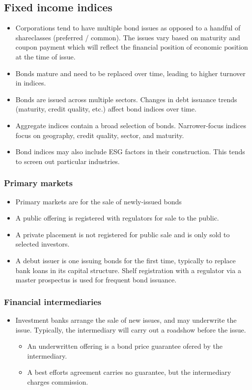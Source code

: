 \documentclass[../notes_compiled.tex]{subfiles}
\begin{document}
\subsection{Fixed income indices}
\begin{itemize}
\item Corporations tend to have multiple bond issues as opposed to a handful of shareclasses (preferred / common). The issues vary based on maturity and coupon payment which will reflect the financial position of economic position at the time of issue.
\item Bonds mature and need to be replaced over time, leading to higher turnover in indices.
\item Bonds are issued across multiple sectors. Changes in debt issuance trends (maturity, credit quality, etc.) affect bond indices over time.
\item Aggregate indices contain a broad selection of bonds. Narrower-focus indices focus on geography, credit quality, sector, and maturity.
\item Bond indices may also include ESG factors in their construction. This tends to screen out particular industries.
\end{itemize}

\subsubsection*{Primary markets}
\begin{itemize}
\item[] Primary markets are for the sale of newly-issued bonds
\item A public offering is registered with regulators for sale to the public.
\item A private placement is not registered for public sale and is only sold to selected investors.
\item A debut issuer is one issuing bonds for the first time, typically to replace bank loans in its capital structure. Shelf registration with a regulator via a master prospectus is used for frequent bond issuance.
\end{itemize}

\subsubsection*{Financial intermediaries}
\begin{itemize}
\item Investment banks arrange the sale of new issues, and may underwrite the issue. Typically, the intermediary will carry out a roadshow before the issue.
\begin{itemize}
\item An underwritten offering is a bond price guarantee ofered by the intermediary.
\item A best efforts agreement carries no guarantee, but the intermediary charges commission.
\end{itemize}
\end{itemize}
\end{document}
